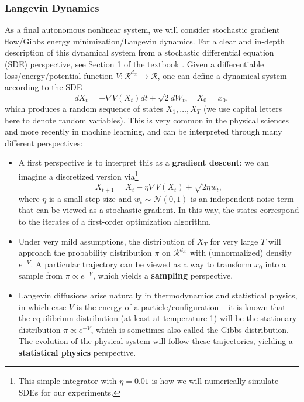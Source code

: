 \documentclass[11pt]{article}
\def\R{{\mathcal R}}
\def\R{\ensuremath{\mathcal R}}
\numberwithin{equation}{section}
\begin{document}
\subsubsection{Langevin Dynamics}
\label{subsection:langevin}
As a final autonomous nonlinear system, we will consider stochastic gradient flow/Gibbs energy minimization/Langevin dynamics. For a clear and in-depth description of this dynamical system from a stochastic differential equation (SDE) perspective, see Section 1 of the textbook \cite{chewi2025logconcave}. Given a differentiable loss/energy/potential function $V: \R^{d_\mathcal{X}} \to \R$, one can define a dynamical system according to the SDE
$$dX_t = -\nabla V(X_t) dt + \sqrt{2}dW_t,\quad X_0 = x_0,$$
which produces a random sequence of states $X_1, \ldots, X_T$ (we use capital letters here to denote random variables). This is very common in the physical sciences and more recently in machine learning, and can be interpreted through many different perspectives:
\begin{itemize}
    \item A first perspective is to interpret this as a \textbf{gradient descent}: we can imagine a discretized version via\footnote{This simple integrator with $\eta = 0.01$ is how we will numerically simulate SDEs for our experiments.} $$X_{t+1} = X_t - \eta \nabla V(X_t) + \sqrt{2\eta}w_t,$$ where $\eta$ is a small step size and $w_t \sim \mathcal{N}(0, 1)$ is an independent noise term that can be viewed as a stochastic gradient. In this way, the states correspond to the iterates of a first-order optimization algorithm.
    \item Under very mild assumptions, the distribution of $X_T$ for very large $T$ will approach the probability distribution $\pi$ on $\R^{d_\mathcal{X}}$ with (unnormalized) density $e^{-V}$. A particular trajectory can be viewed as a way to transform $x_0$ into a sample from $\pi \propto e^{-V}$, which yields a \textbf{sampling} perspective.
    \item Langevin diffusions arise naturally in thermodynamics and statistical physics, in which case $V$ is the energy of a particle/configuration -- it is known that the equilibrium distribution (at least at temperature 1) will be the stationary distribution $\pi \propto e^{-V}$, which is sometimes also called the Gibbs distribution. The evolution of the physical system will follow these trajectories, yielding a \textbf{statistical physics} perspective.
\end{itemize}
\end{document}
